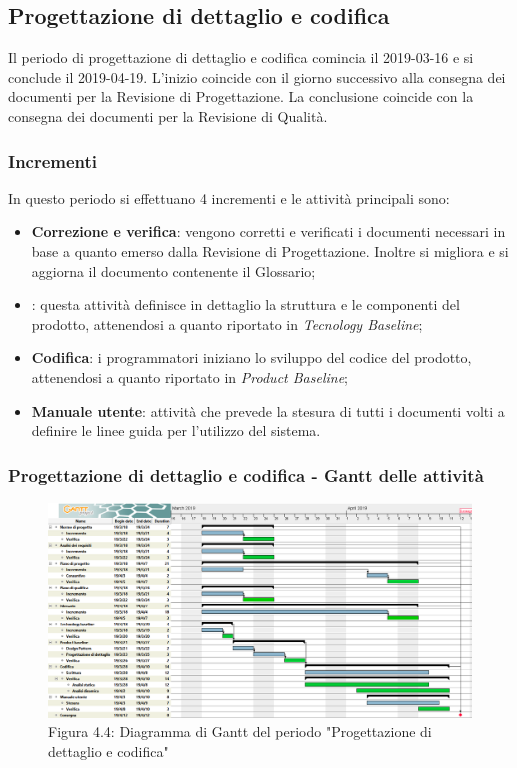 \subsection{Progettazione di dettaglio e codifica}
Il periodo di progettazione di dettaglio e codifica comincia il 2019-03-16 e si conclude il 2019-04-19. L'inizio coincide con il giorno successivo alla consegna dei documenti per la Revisione di Progettazione. La conclusione coincide con la consegna dei documenti per la Revisione di Qualità. 
\subsubsection{Incrementi}
In questo periodo si effettuano 4 incrementi e le attività principali sono:
\begin{itemize}
\item{\textbf{Correzione e verifica}: vengono corretti e verificati i documenti necessari in base a quanto emerso dalla Revisione di Progettazione. Inoltre si migliora e si aggiorna il documento contenente il Glossario;} 
\item{\textbf{}: questa attività definisce in dettaglio la struttura e le componenti del prodotto, attenendosi a quanto riportato in \emph{Tecnology Baseline};} 
\item{\textbf{Codifica}: i programmatori iniziano lo sviluppo del codice del prodotto, attenendosi a quanto riportato in \emph{Product Baseline};}	
\item{\textbf{Manuale utente}: attività che prevede la stesura di tutti i documenti volti a definire le linee guida per l'utilizzo del sistema.}
\end{itemize}

\subsubsection{Progettazione di dettaglio e codifica - Gantt delle attività}

\begin{figure} [H]
	\centering
	\includegraphics[scale=0.35]{Res/Gantt/Codifica}
	\caption{Figura 4.4: Diagramma di Gantt del periodo "Progettazione di dettaglio e codifica"}\label{}
\end{figure}

\pagebreak
